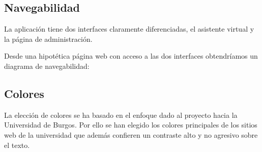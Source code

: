 \subsection{Navegabilidad}

La aplicación tiene dos interfaces claramente diferenciadas, el asistente virtual y la página de administración.

Desde una hipotética página web con acceso a las dos interfaces obtendríamos un diagrama de navegabilidad:


\subsection{Colores}

La elección de colores se ha basado en el enfoque dado al proyecto hacia la Universidad de Burgos. Por ello se han elegido los colores principales de los sitios web de la universidad que además confieren un contraste alto y no agresivo sobre el texto.

